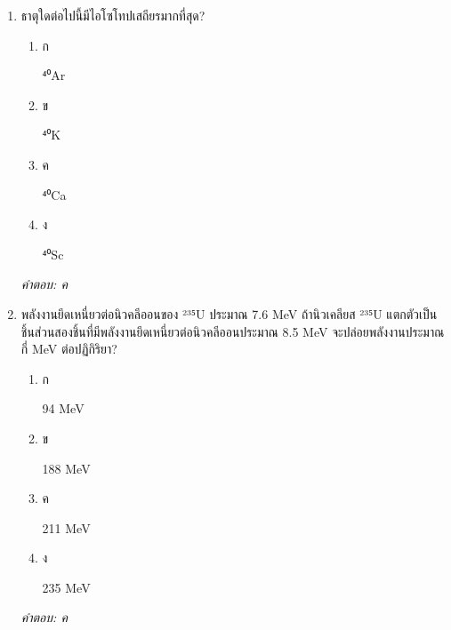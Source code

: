 \documentclass[12pt]{article}
\begin{document}
\begin{enumerate}[label=\arabic*., itemsep=0.5\baselineskip, topsep=0.5\baselineskip, leftmargin=*]
\item ธาตุใดต่อไปนี้มีไอโซโทปเสถียรมากที่สุด?
\begin{enumerate}[label=\alph*)., itemsep=0.3\baselineskip, topsep=0.3\baselineskip]
\item ก\ 
\begin{minipage}[t]{0.9\linewidth}
\raggedright ⁴⁰Ar
\end{minipage}
\item ข\ 
\begin{minipage}[t]{0.9\linewidth}
\raggedright ⁴⁰K
\end{minipage}
\item ค\ 
\begin{minipage}[t]{0.9\linewidth}
\raggedright ⁴⁰Ca
\end{minipage}
\item ง\ 
\begin{minipage}[t]{0.9\linewidth}
\raggedright ⁴⁰Sc
\end{minipage}
\end{enumerate}
\vspace{-0.3\baselineskip}
\begin{small}
\textit{คำตอบ: ค}
\end{small}

\item พลังงานยึดเหนี่ยวต่อนิวคลีออนของ ²³⁵U ประมาณ 7.6 MeV ถ้านิวเคลียส ²³⁵U แตกตัวเป็นชิ้นส่วนสองชิ้นที่มีพลังงานยึดเหนี่ยวต่อนิวคลีออนประมาณ 8.5 MeV จะปล่อยพลังงานประมาณกี่ MeV ต่อปฏิกิริยา?
\begin{enumerate}[label=\alph*)., itemsep=0.3\baselineskip, topsep=0.3\baselineskip]
\item ก\ 
\begin{minipage}[t]{0.9\linewidth}
\raggedright 94 MeV
\end{minipage}
\item ข\ 
\begin{minipage}[t]{0.9\linewidth}
\raggedright 188 MeV
\end{minipage}
\item ค\ 
\begin{minipage}[t]{0.9\linewidth}
\raggedright 211 MeV
\end{minipage}
\item ง\ 
\begin{minipage}[t]{0.9\linewidth}
\raggedright 235 MeV
\end{minipage}
\end{enumerate}
\vspace{-0.3\baselineskip}
\begin{small}
\textit{คำตอบ: ค}
\end{small}


\end{enumerate}
\end{document}

